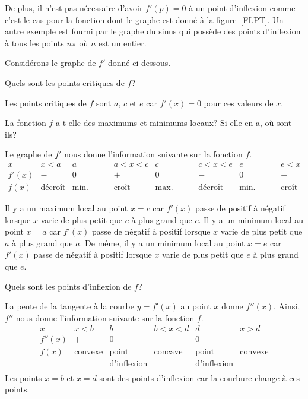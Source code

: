 {\begin{rmk}
De plus, il n'est pas nécessaire d'avoir $f'(p)=0$ à un point
d'inflexion comme c'est le cas pour la fonction dont le graphe est
donné à la figure~\ref{FLPT}.  Un autre
exemple est fourni par le graphe du sinus qui possède des points
d'inflexion à tous les points $n\pi$ où $n$ est un entier.
\end{rmk}



\begin{egg}
Considérons le graphe de $f'$ donné ci-dessous.

 Quels sont les points critiques de $f$?

Les points critiques de $f$ sont $a$, $c$ et $e$ car
$f'(x)=0$ pour ces valeurs de $x$.

 La fonction $f$ a-t-elle des maximums et minimums locaux?  Si
elle en a, où sont-ils?

Le graphe de $f'$ nous donne l'information suivante sur la fonction
$f$.
\[
\begin{array}{c|c|c|c|c|c|c|c}
x & x<a & a & a<x<c & c & c<x<e & e & e<x \\
\hline
f'(x) & - & 0 & + & 0 & - & 0 & + \\
\hline
f(x) & \text{décroît} & \text{min. local} & \text{croît}
& \text{max. local} & \text{décroît} & \text{min. local}
&  \text{croît}
\end{array}
\]

Il y a un maximum local au point $x=c$ car $f'(x)$ passe de
positif à négatif lorsque $x$ varie de plus petit que $c$ à plus grand
que $c$.  Il y a un minimum local au point $x=a$ car $f'(x)$ passe de 
négatif à positif lorsque $x$ varie de plus petit que $a$ à plus grand
que $a$.  De même, il y a un minimum local au point $x=e$ car $f'(x)$ 
passe de négatif à positif lorsque $x$ varie de plus petit que $e$ à
plus grand que $e$.

 Quels sont les points d'inflexion de $f$?

La pente de la tangente à la courbe $y=f'(x)$ au point $x$
donne $f''(x)$.  Ainsi, $f''$ nous donne l'information suivante sur la
fonction $f$.
\[
\begin{array}{c|c|c|c|c|c}
x & x<b & b & b<x<d & d & x>d \\
\hline
f''(x) & + & 0 & - & 0 & + \\
\hline
f(x) & \text{convexe} & \text{point} & \text{concave} & \text{point} &
\text{convexe} \\
& & \text{d'inflexion} & & \text{d'inflexion} & \\
\end{array}
\]
Les points $x=b$ et $x=d$ sont des points d'inflexion car la courbure
change à ces points.
\end{egg}

}
